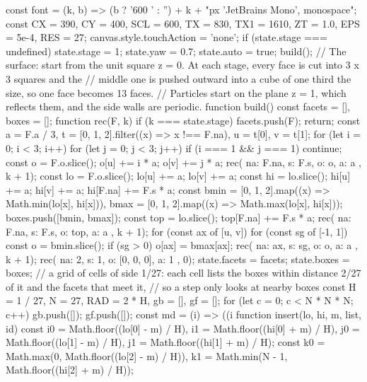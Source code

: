 \begin{js}[size=1640x700, frames=1, alt="Interactive: a cubic von Koch surface drawn in three dimensions, colored by how often diffusing particles land on each part, from dark blue (rarely) to red (often); buttons choose the stage of the construction; drag to rotate"]
const font = (k, b) => (b ? '600 ' : '') + k + "px 'JetBrains Mono', monospace";
const CX = 390, CY = 400, SCL = 600, TX = 830, TX1 = 1610, ZT = 1.0, EPS = 5e-4, RES = 27;
canvas.style.touchAction = 'none';
if (state.stage === undefined) { state.stage = 1; state.yaw = 0.7; state.auto = true; build(); }
// The surface: start from the unit square z = 0. At each stage, every face is cut into 3 x 3 squares and the
// middle one is pushed outward into a cube of one third the size, so one face becomes 13 faces.
// Particles start on the plane z = 1, which reflects them, and the side walls are periodic.
function build() {
  const facets = [], boxes = [];
  function rec(F, k) {
    if (k === state.stage) { facets.push(F); return; }
    const a = F.a / 3, t = [0, 1, 2].filter((x) => x !== F.na), u = t[0], v = t[1];
    for (let i = 0; i < 3; i++) for (let j = 0; j < 3; j++) {
      if (i === 1 && j === 1) continue;
      const o = F.o.slice(); o[u] += i * a; o[v] += j * a; rec({ na: F.na, s: F.s, o: o, a: a }, k + 1);
    }
    const lo = F.o.slice(); lo[u] += a; lo[v] += a;
    const hi = lo.slice(); hi[u] += a; hi[v] += a; hi[F.na] += F.s * a;
    const bmin = [0, 1, 2].map((x) => Math.min(lo[x], hi[x])), bmax = [0, 1, 2].map((x) => Math.max(lo[x], hi[x]));
    boxes.push([bmin, bmax]);
    const top = lo.slice(); top[F.na] += F.s * a; rec({ na: F.na, s: F.s, o: top, a: a }, k + 1);
    for (const ax of [u, v]) for (const sg of [-1, 1]) {
      const o = bmin.slice(); if (sg > 0) o[ax] = bmax[ax];
      rec({ na: ax, s: sg, o: o, a: a }, k + 1);
    }
  }
  rec({ na: 2, s: 1, o: [0, 0, 0], a: 1 }, 0);
  state.facets = facets; state.boxes = boxes;
  // a grid of cells of side 1/27: each cell lists the boxes within distance 2/27 of it and the facets that meet it,
  // so a step only looks at nearby boxes
  const H = 1 / 27, N = 27, RAD = 2 * H, gb = [], gf = [];
  for (let c = 0; c < N * N * N; c++) { gb.push([]); gf.push([]); }
  const md = (i) => ((i %
  function insert(lo, hi, m, list, id) {
    const i0 = Math.floor((lo[0] - m) / H), i1 = Math.floor((hi[0] + m) / H), j0 = Math.floor((lo[1] - m) / H), j1 = Math.floor((hi[1] + m) / H);
    const k0 = Math.max(0, Math.floor((lo[2] - m) / H)), k1 = Math.min(N - 1, Math.floor((hi[2] + m) / H));
}}
\end{js}
